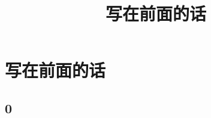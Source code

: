 \documentclass{article}
\begin{document}
\title{写在前面的话}
\date{}
\maketitle
\else
\chapter*{写在前面的话}
\fi
\section*{0}

\ifx\allfiles\undefined
\end{document}
